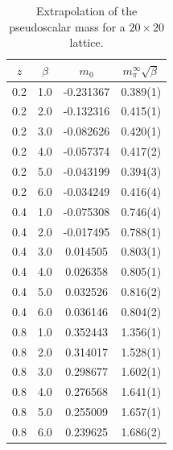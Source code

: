 \begin{table}
    \centering
    \begin{tabular}{c|c|c|c}
        $z$ & $\beta$ & $m_0$ & $m_{\pi}^{\infty}\sqrt{\beta}$  \\
        \hline \hline
        0.2 & 1.0 & -0.231367 & 0.389(1) \\
        0.2 & 2.0 & -0.132316 & 0.415(1) \\
        0.2 & 3.0 & -0.082626 & 0.420(1) \\
        0.2 & 4.0 & -0.057374 & 0.417(2) \\
        0.2 & 5.0 & -0.043199 & 0.394(3) \\
        0.2 & 6.0 & -0.034249 & 0.416(4) \\
        0.4 & 1.0 & -0.075308 & 0.746(4) \\
        0.4 & 2.0 & -0.017495 & 0.788(1) \\
        0.4 & 3.0 & 0.014505 & 0.803(1) \\
        0.4 & 4.0 & 0.026358 & 0.805(1) \\
        0.4 & 5.0 & 0.032526 & 0.816(2) \\
        0.4 & 6.0 & 0.036146 & 0.804(2) \\
        0.8 & 1.0 & 0.352443 & 1.356(1) \\
        0.8 & 2.0 & 0.314017 & 1.528(1) \\
        0.8 & 3.0 & 0.298677 & 1.602(1) \\
        0.8 & 4.0 & 0.276568 & 1.641(1) \\
        0.8 & 5.0 & 0.255009 & 1.657(1) \\
        0.8 & 6.0 & 0.239625 & 1.686(2) \\
    \end{tabular}
    \caption{Extrapolation of the pseudoscalar mass for a $20 \times 20$ lattice.}
    \label{tab: pion 20}
\end{table}
